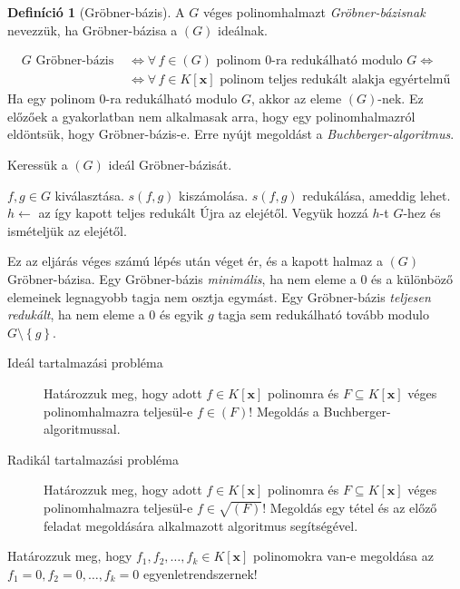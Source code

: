 \documentclass[%
	DIV=15,appendixprefix]{scrreprt}
\theoremstyle{definition}
\newtheorem*{defin}{Definíció}
\theoremstyle{remark}
\begin{document}
\begin{defin}[Gröbner-bázis]
	A $ G $ véges polinomhalmazt \emph{Gröbner-bázisnak} nevezzük, ha Gröbner-bázisa a $ \left( G
	\right) $ ideálnak.
\end{defin}
\begin{equation*}
	\begin{split}
		G \text{ Gröbner-bázis } &\Leftrightarrow \forall \, f \in \left( G \right) \text{ polinom
		0-ra redukálható modulo } G \Leftrightarrow\\
		&\Leftrightarrow \forall \, f\in K \left[ \mathbf{ x } \right]
		\text{ polinom teljes redukált alakja egyértelmű}
	\end{split}
\end{equation*}
Ha egy polinom 0-ra redukálható modulo $ G $, akkor az eleme $ \left( G \right) $-nek.
%
Ez előzőek a gyakorlatban nem alkalmasak arra, hogy egy polinomhalmazról eldöntsük, hogy
Gröbner-bázis-e. Erre nyújt megoldást a \emph{Buchberger-algoritmus}.

Keressük a $ \left( G \right) $ ideál Gröbner-bázisát.
\begin{algorithmic}[1]
	\State $ f,{} g \in G $ kiválasztása.
	\State $ s \left( f,{} g \right) $ kiszámolása.
	\State $ s \left( f,{} g \right) $  redukálása, ameddig lehet.
	\State $ h  \gets$ az így kapott teljes redukált
		\State Újra az elejétől.
	\Else
		\State Vegyük hozzá $ h $-t $ G $-hez és ismételjük az elejétől.
	\EndIf
\end{algorithmic}
Ez az eljárás véges számú lépés után véget ér, és a kapott halmaz a $ \left( G \right) $
Gröbner-bázisa.
Egy Gröbner-bázis \emph{minimális}, ha nem eleme a 0 és a különböző elemeinek legnagyobb tagja nem
osztja egymást. Egy Gröbner-bázis \emph{teljesen redukált}, ha nem eleme a 0 és egyik $ g $ tagja
sem redukálható tovább modulo $ G \setminus \left\{ g \right\}$.
\begin{description}
	\item[Ideál tartalmazási probléma] Határozzuk meg, hogy adott $ f \in K \left[ \mathbf{ x }
		\right] $ polinomra és $ F \subseteq K \left[ \mathbf{ x } \right] $ véges polinomhalmazra
		teljesül-e $ f \in \left( F \right) $! Megoldás a Buchberger-algoritmussal.
	\item[Radikál tartalmazási probléma] Határozzuk meg, hogy adott $ f \in  K \left[ \mathbf{ x }
		\right]$ polinomra és $ F \subseteq K \left[ \mathbf{ x } \right] $ véges polinomhalmazra
		teljesül-e $ f \in \sqrt{ \left( F \right) }$! Megoldás egy tétel és az előző feladat
		megoldására alkalmazott algoritmus segítségével.
\end{description}
%
Határozzuk meg, hogy $ f_{ 1 },{} f_{ 2 },{} \ldots,{} f_{ k } \in K \left[ \mathbf{ x } \right] $
polinomokra van-e megoldása az $ f_{ 1 } = 0,{} f_{ 2 } = 0,{} \ldots,{} f_{ k } = 0 $
egyenletrendszernek!
\end{document}
